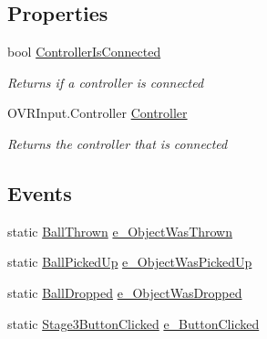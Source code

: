 \subsection*{Properties}
\begin{DoxyCompactItemize}
\item 
bool \mbox{\hyperlink{class_v_r_standard_assets_1_1_utils_1_1_raycaster_v_r_a4dfde4ab9f19a3c914e3d87ffe11a561}{Controller\+Is\+Connected}}
\begin{DoxyCompactList}\small\item\em Returns if a controller is connected \end{DoxyCompactList}\item 
O\+V\+R\+Input.\+Controller \mbox{\hyperlink{class_v_r_standard_assets_1_1_utils_1_1_raycaster_v_r_a1de057b507bb494d68142465fa519145}{Controller}}
\begin{DoxyCompactList}\small\item\em Returns the controller that is connected \end{DoxyCompactList}\end{DoxyCompactItemize}
\subsection*{Events}
\begin{DoxyCompactItemize}
\item 
static \mbox{\hyperlink{class_v_r_standard_assets_1_1_utils_1_1_raycaster_v_r_a208df26f1139ba566bd76ab13e654fac}{Ball\+Thrown}} \mbox{\hyperlink{class_v_r_standard_assets_1_1_utils_1_1_raycaster_v_r_a62d35bb4bf621e1d9b41991805091848}{e\+\_\+\+Object\+Was\+Thrown}}
\item 
static \mbox{\hyperlink{class_v_r_standard_assets_1_1_utils_1_1_raycaster_v_r_a85241158337110726e61258a3237752e}{Ball\+Picked\+Up}} \mbox{\hyperlink{class_v_r_standard_assets_1_1_utils_1_1_raycaster_v_r_ad264493543b631d078818d28706e21bb}{e\+\_\+\+Object\+Was\+Picked\+Up}}
\item 
static \mbox{\hyperlink{class_v_r_standard_assets_1_1_utils_1_1_raycaster_v_r_afa0e8c643d924f0f008364e153844e5f}{Ball\+Dropped}} \mbox{\hyperlink{class_v_r_standard_assets_1_1_utils_1_1_raycaster_v_r_ac6de8fe7e5086c4d89161e834153ece6}{e\+\_\+\+Object\+Was\+Dropped}}
\item 
static \mbox{\hyperlink{class_v_r_standard_assets_1_1_utils_1_1_raycaster_v_r_a68cab6ce8e6920717a4c08bc6f3992d8}{Stage3\+Button\+Clicked}} \mbox{\hyperlink{class_v_r_standard_assets_1_1_utils_1_1_raycaster_v_r_a6e380949eb3ae23d311cb3a4ae52313a}{e\+\_\+\+Button\+Clicked}}
\end{DoxyCompactItemize}
